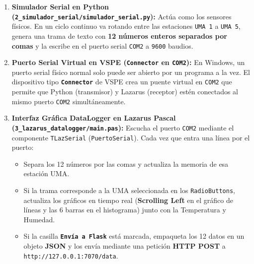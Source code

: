 \documentclass[11pt,a4paper]{article}
\begin{document}
\begin{enumerate}[leftmargin=1.5em]
    \item \textbf{Simulador Serial en Python (\texttt{2\_simulador\_serial/simulador\_serial.py}):}
    Actúa como los sensores físicos. En un ciclo continuo va rotando entre las estaciones \texttt{UMA 1} a \texttt{UMA 5}, genera una trama de texto con \textbf{12 números enteros separados por comas} y la escribe en el puerto serial \texttt{COM2} a \texttt{9600} baudios.
    
    \item \textbf{Puerto Serial Virtual en VSPE (\texttt{Connector} en \texttt{COM2}):}
    En Windows, un puerto serial físico normal solo puede ser abierto por un programa a la vez. El dispositivo tipo \textbf{\texttt{Connector}} de VSPE crea un puente virtual en \texttt{COM2} que permite que Python (transmisor) y Lazarus (receptor) estén conectados al mismo puerto \texttt{COM2} simultáneamente.
    
    \item \textbf{Interfaz Gráfica DataLogger en Lazarus Pascal (\texttt{3\_lazarus\_datalogger/main.pas}):}
    Escucha el puerto \texttt{COM2} mediante el componente \texttt{TLazSerial} (\texttt{PuertoSerial}). Cada vez que entra una línea por el puerto:
    \begin{itemize}
        \item Separa los 12 números por las comas y actualiza la memoria de esa estación UMA.
        \item Si la trama corresponde a la UMA seleccionada en los \texttt{RadioButtons}, actualiza los gráficos en tiempo real (\textbf{Scrolling Left} en el gráfico de líneas y las 6 barras en el histograma) junto con la Temperatura y Humedad.
        \item Si la casilla \textbf{\texttt{Envía a Flask}} está marcada, empaqueta los 12 datos en un objeto \textbf{JSON} y los envía mediante una petición \textbf{HTTP POST} a \texttt{http://127.0.0.1:7070/data}.
    \end{itemize}
    

\end{enumerate}
\end{document}
